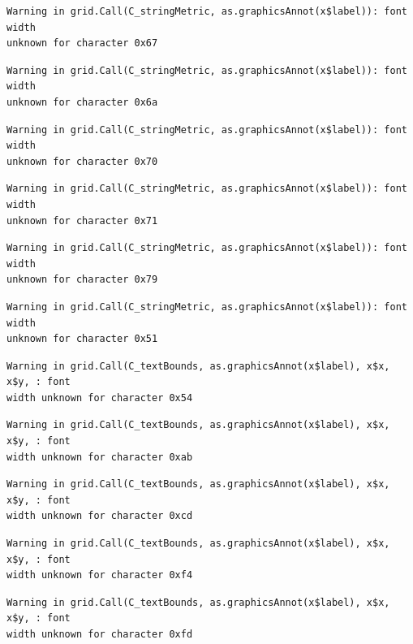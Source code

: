 \documentclass[
  letterpaper,
  DIV=11,
  numbers=noendperiod]{scrreprt}
\begin{document}
\begin{verbatim}
Warning in grid.Call(C_stringMetric, as.graphicsAnnot(x$label)): font width
unknown for character 0x67
\end{verbatim}

\begin{verbatim}
Warning in grid.Call(C_stringMetric, as.graphicsAnnot(x$label)): font width
unknown for character 0x6a
\end{verbatim}

\begin{verbatim}
Warning in grid.Call(C_stringMetric, as.graphicsAnnot(x$label)): font width
unknown for character 0x70
\end{verbatim}

\begin{verbatim}
Warning in grid.Call(C_stringMetric, as.graphicsAnnot(x$label)): font width
unknown for character 0x71
\end{verbatim}

\begin{verbatim}
Warning in grid.Call(C_stringMetric, as.graphicsAnnot(x$label)): font width
unknown for character 0x79
\end{verbatim}

\begin{verbatim}
Warning in grid.Call(C_stringMetric, as.graphicsAnnot(x$label)): font width
unknown for character 0x51
\end{verbatim}

\begin{verbatim}
Warning in grid.Call(C_textBounds, as.graphicsAnnot(x$label), x$x, x$y, : font
width unknown for character 0x54
\end{verbatim}

\begin{verbatim}
Warning in grid.Call(C_textBounds, as.graphicsAnnot(x$label), x$x, x$y, : font
width unknown for character 0xab
\end{verbatim}

\begin{verbatim}
Warning in grid.Call(C_textBounds, as.graphicsAnnot(x$label), x$x, x$y, : font
width unknown for character 0xcd
\end{verbatim}

\begin{verbatim}
Warning in grid.Call(C_textBounds, as.graphicsAnnot(x$label), x$x, x$y, : font
width unknown for character 0xf4
\end{verbatim}

\begin{verbatim}
Warning in grid.Call(C_textBounds, as.graphicsAnnot(x$label), x$x, x$y, : font
width unknown for character 0xfd
\end{verbatim}
\end{document}
